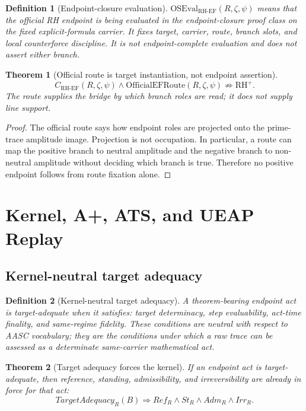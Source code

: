 \documentclass[11pt]{article}
\newtheorem{definition}{Definition}[section]
\newtheorem{theorem}{Theorem}[section]
\newcommand{\RH}{\mathrm{RH}}
\newcommand{\CRHEF}{C_{\mathrm{RH}\text{-}\mathrm{EF}}}
\newcommand{\OfficialEFRoute}{\mathrm{OfficialEFRoute}}
\newcommand{\OSEvalEF}{\mathrm{OSEval}_{\mathrm{RH}\text{-}\mathrm{EF}}}
\begin{document}
\begin{definition}[Endpoint-closure evaluation]
\(\OSEvalEF(R,\zeta,\psi)\) means that the official RH endpoint is being evaluated in the endpoint-closure proof class on the fixed explicit-formula carrier.  It fixes target, carrier, route, branch slots, and local counterforce discipline.  It is not endpoint-complete evaluation and does not assert either branch.
\end{definition}

\begin{theorem}[Official route is target instantiation, not endpoint assertion]
\[
\CRHEF(R,\zeta,\psi)\wedge \OfficialEFRoute(R,\zeta,\psi)
\not\Rightarrow \RH^+.
\]
The route supplies the bridge by which branch roles are read; it does not supply line support.
\end{theorem}

\begin{proof}
The official route says how endpoint roles are projected onto the prime-trace amplitude image.  Projection is not occupation.  In particular, a route can map the positive branch to neutral amplitude and the negative branch to non-neutral amplitude without deciding which branch is true.  Therefore no positive endpoint follows from route fixation alone.
\end{proof}

\section{Kernel, A+, ATS, and UEAP Replay}

\subsection{Kernel-neutral target adequacy}

\begin{definition}[Kernel-neutral target adequacy]
A theorem-bearing endpoint act is target-adequate when it satisfies: target determinacy, step evaluability, act-time finality, and same-regime fidelity.  These conditions are neutral with respect to AASC vocabulary; they are the conditions under which a raw trace can be assessed as a determinate same-carrier mathematical act.
\end{definition}

\begin{theorem}[Target adequacy forces the kernel]
If an endpoint act is target-adequate, then reference, standing, admissibility, and irreversibility are already in force for that act:
\[
TargetAdequacy_R(B)\Rightarrow Ref_R\wedge St_R\wedge Adm_R\wedge Irr_R.
\]
\end{theorem}
\end{document}
